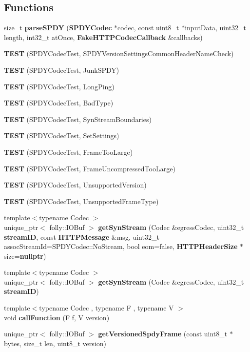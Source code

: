 \subsection*{Functions}
\begin{DoxyCompactItemize}
\item 
size\+\_\+t {\bf parse\+S\+P\+DY} ({\bf S\+P\+D\+Y\+Codec} $\ast$codec, const uint8\+\_\+t $\ast$input\+Data, uint32\+\_\+t length, int32\+\_\+t at\+Once, {\bf Fake\+H\+T\+T\+P\+Codec\+Callback} \&callbacks)
\item 
{\bf T\+E\+ST} (S\+P\+D\+Y\+Codec\+Test, S\+P\+D\+Y\+Version\+Settings\+Common\+Header\+Name\+Check)
\item 
{\bf T\+E\+ST} (S\+P\+D\+Y\+Codec\+Test, Junk\+S\+P\+DY)
\item 
{\bf T\+E\+ST} (S\+P\+D\+Y\+Codec\+Test, Long\+Ping)
\item 
{\bf T\+E\+ST} (S\+P\+D\+Y\+Codec\+Test, Bad\+Type)
\item 
{\bf T\+E\+ST} (S\+P\+D\+Y\+Codec\+Test, Syn\+Stream\+Boundaries)
\item 
{\bf T\+E\+ST} (S\+P\+D\+Y\+Codec\+Test, Set\+Settings)
\item 
{\bf T\+E\+ST} (S\+P\+D\+Y\+Codec\+Test, Frame\+Too\+Large)
\item 
{\bf T\+E\+ST} (S\+P\+D\+Y\+Codec\+Test, Frame\+Uncompressed\+Too\+Large)
\item 
{\bf T\+E\+ST} (S\+P\+D\+Y\+Codec\+Test, Unsupported\+Version)
\item 
{\bf T\+E\+ST} (S\+P\+D\+Y\+Codec\+Test, Unsupported\+Frame\+Type)
\item 
{\footnotesize template$<$typename Codec $>$ }\\unique\+\_\+ptr$<$ folly\+::\+I\+O\+Buf $>$ {\bf get\+Syn\+Stream} (Codec \&egress\+Codec, uint32\+\_\+t {\bf stream\+ID}, const {\bf H\+T\+T\+P\+Message} \&msg, uint32\+\_\+t assoc\+Stream\+Id=S\+P\+D\+Y\+Codec\+::\+No\+Stream, bool eom=false, {\bf H\+T\+T\+P\+Header\+Size} $\ast$size={\bf nullptr})
\item 
{\footnotesize template$<$typename Codec $>$ }\\unique\+\_\+ptr$<$ folly\+::\+I\+O\+Buf $>$ {\bf get\+Syn\+Stream} (Codec \&egress\+Codec, uint32\+\_\+t {\bf stream\+ID})
\item 
{\footnotesize template$<$typename Codec , typename F , typename V $>$ }\\void {\bf call\+Function} (F f, V version)
\item 
unique\+\_\+ptr$<$ folly\+::\+I\+O\+Buf $>$ {\bf get\+Versioned\+Spdy\+Frame} (const uint8\+\_\+t $\ast$bytes, size\+\_\+t len, uint8\+\_\+t version)

\end{DoxyCompactItemize}
